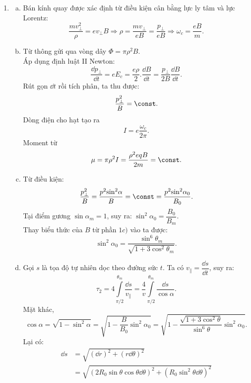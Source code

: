 \begin{loigiai}
\begin{enumerate}[1)]
\begin{enumerate}[a)]
        \end{enumerate}
        \item\begin{enumerate}[a)]
            \item Bán kính quay được xác định từ điều kiện cân bằng lực ly tâm và lực Lorentz:
             \[\dfrac{mv_{\perp }^{2}}{\rho }=e{{v}_{\perp }}B
             \Rightarrow \rho =\dfrac{m{{v}_{\perp }}}{eB}=\dfrac{{{p}_{\perp}}}{eB}
             \Rightarrow {{\omega}_{c}}=\dfrac{eB}{m}.\]
            \item Từ thông gửi qua vòng dây $\Phi =\pi {{\rho }^{2}}B$.
            \\Áp dụng định luật II Newton: \[\dfrac{\dd{{p}_{\perp }}}{\dd t}=e{{E}_{c}}=\dfrac{e\rho }{2}.\dfrac{\dd B}{\dd t}=\dfrac{{{p}_{\perp  }}}{2B}\dfrac{\dd B}{\dd t}.\]
            Rút gọn $\dd t$ rồi tích phân, ta thu được: 
            \[\dfrac{p_{\perp }^{2}}{B}=\const.\]
            Dòng điện cho hạt tạo ra 
            \[I=e\dfrac{{{\omega }_{c}}}{2\pi }.\]
            Moment từ 
            \[\mu =\pi {{\rho }^{2}}I=\dfrac{{{\rho }^{2}}eqB}{2m}=\const.\]
            \item Từ điều kiện:
            \[\dfrac{p_{\perp}^{2}}{B}=\dfrac{{{p}^{2}}{{\sin }^{2}}\alpha }{B}=\const = \dfrac{{{p}^{2}}{{\sin }^{2}}{{\alpha }_{0}}}{{{B}_{0}}}.\]
            Tại điểm gương $\sin {{\alpha }_{m}}=1$, suy ra: ${{\sin }^{2}}{{\alpha }_{0}}=\dfrac{{{B}_{0}}}{{{B}_{m}}}$.
            \\Thay biểu thức của $B$ từ phần $1c)$ vào ta được: 
        	\[{{\sin }^{2}}{{\alpha }_{0}}=\dfrac{{{\sin }^{6}}{{\theta }_{m}}}{\sqrt{1+3{{\cos }^{2}}{{\theta }_{m}}}}.\]
            \item Gọi $s$ là tọa độ tự nhiên dọc theo đường sức $t$. Ta có ${{v}_{\parallel}}=\dfrac{\dd s}{\dd t}$, suy ra:
            \[{{\tau }_{2}}=4\int\limits_{\pi /2}^{{{\theta }_{m}}}{\dfrac{\dd s}{{{v}_{\parallel}}}}=\dfrac{4}{v}\int\limits_{\pi /2}^{{{\theta }_{m}}}{\dfrac{\dd s}{\cos \alpha }}.\]
            Mặt khác,
            \[\cos \alpha =\sqrt{1-{{\sin }^{2}}\alpha }=\sqrt{1-\dfrac{B}{{{B}_{0}}}{{\sin }^{2}}{{\alpha }_{0}}}=\sqrt{1-\dfrac{\sqrt{1+3{{\cos }^{2}}\theta }}{{{\sin }^{6}}\theta }{{\sin }^{2}}{{\alpha }_{0}}}.\]
            Lại có:
            \[\begin{aligned}
                \dd s&=\sqrt{{{\left( \dd r \right)}^{2}}+{{\left( r\dd \theta  \right)}^{2}}}\\
                &=\sqrt{{{\left( 2{{R}_{0}}\sin \theta \cos \theta \dd \theta  \right)}^{2}}+{{\left( {{R}_{0}}{{\sin }^{2}}\theta \dd\theta  \right)}^{2}}}\\

\end{aligned}\]
\end{enumerate}
\end{enumerate}
\end{loigiai}
